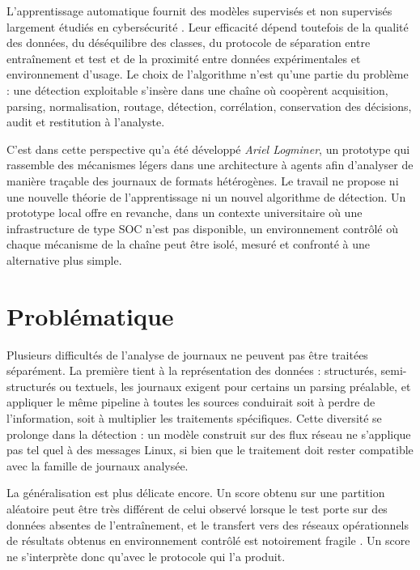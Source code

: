 L'apprentissage automatique fournit des modèles supervisés et non supervisés largement étudiés en cybersécurité \cite{buczak2016survey,khraisat2019survey}. Leur efficacité dépend toutefois de la qualité des données, du déséquilibre des classes, du protocole de séparation entre entraînement et test et de la proximité entre données expérimentales et environnement d'usage. Le choix de l'algorithme n'est qu'une partie du problème : une détection exploitable s'insère dans une chaîne où coopèrent acquisition, parsing, normalisation, routage, détection, corrélation, conservation des décisions, audit et restitution à l'analyste.

C'est dans cette perspective qu'a été développé \textit{Ariel Logminer}, un prototype qui rassemble des mécanismes légers dans une architecture à agents afin d'analyser de manière traçable des journaux de formats hétérogènes. Le travail ne propose ni une nouvelle théorie de l'apprentissage ni un nouvel algorithme de détection. Un prototype local offre en revanche, dans un contexte universitaire où une infrastructure de type SOC n'est pas disponible, un environnement contrôlé où chaque mécanisme de la chaîne peut être isolé, mesuré et confronté à une alternative plus simple.


\section*{Problématique}


Plusieurs difficultés de l'analyse de journaux ne peuvent pas être traitées séparément. La première tient à la représentation des données : structurés, semi-structurés ou textuels, les journaux exigent pour certains un parsing préalable, et appliquer le même pipeline à toutes les sources conduirait soit à perdre de l'information, soit à multiplier les traitements spécifiques. Cette diversité se prolonge dans la détection : un modèle construit sur des flux réseau ne s'applique pas tel quel à des messages Linux, si bien que le traitement doit rester compatible avec la famille de journaux analysée.

La généralisation est plus délicate encore. Un score obtenu sur une partition aléatoire peut être très différent de celui observé lorsque le test porte sur des données absentes de l'entraînement, et le transfert vers des réseaux opérationnels de résultats obtenus en environnement contrôlé est notoirement fragile \cite{sommer2010outside}. Un score ne s'interprète donc qu'avec le protocole qui l'a produit.

